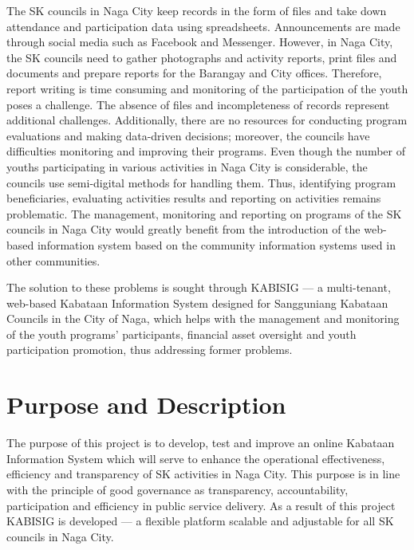 \vspace{3mm}
\hspace*{\parindent}The SK councils in Naga City keep records in the form of files and take down attendance and participation data using spreadsheets. Announcements are made through social media such as Facebook and Messenger. However, in Naga City, the SK councils need to gather photographs and activity reports, print files and documents and prepare reports for the Barangay and City offices. Therefore, report writing is time consuming and monitoring of the participation of the youth poses a challenge. The absence of files and incompleteness of records represent additional challenges. Additionally, there are no resources for conducting program evaluations and making data-driven decisions; moreover, the councils have difficulties monitoring and improving their programs. Even though the number of youths participating in various activities in Naga City is considerable, the councils use semi-digital methods for handling them. Thus, identifying program beneficiaries, evaluating activities results and reporting on activities remains problematic. The management, monitoring and reporting on programs of the SK councils in Naga City would greatly benefit from the introduction of the web-based information system based on the community information systems used in other communities.

\vspace{3mm}
\hspace*{\parindent}The solution to these problems is sought through KABISIG --- a multi-tenant, web-based Kabataan Information System designed for Sangguniang Kabataan Councils in the City of Naga, which helps with the management and monitoring of the youth programs' participants, financial asset oversight and youth participation promotion, thus addressing former problems.
\vspace{5mm}

\section{Purpose and Description}
\label{sec:purpose_and_description}

\hspace*{\parindent}The purpose of this project is to develop, test and improve an online Kabataan Information System which will serve to enhance the operational effectiveness, efficiency and transparency of SK activities in Naga City. This purpose is in line with the principle of good governance as transparency, accountability, participation and efficiency in public service delivery. As a result of this project KABISIG is developed --- a flexible platform scalable and adjustable for all SK councils in Naga City.

